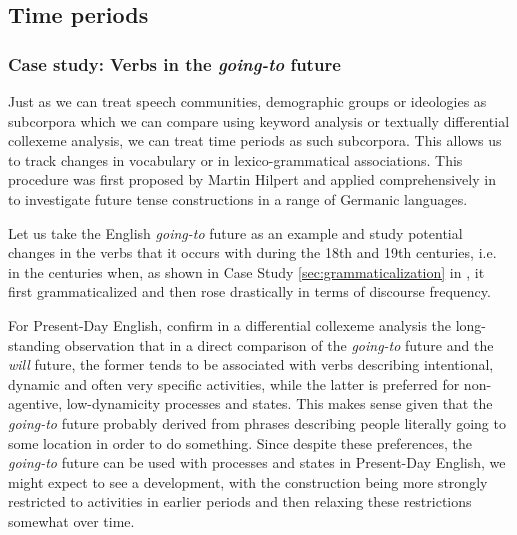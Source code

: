 \subsection{Time periods}

\subsubsection{Case study: Verbs in the \textit{going\hyp{}to} future}

Just as we can treat speech communities, demographic  groups or ideologies  as subcorpora which we can compare using keyword  analysis or textually differential collexeme  analysis, we can treat time periods as such subcorpora. This allows us to track changes in vocabulary or in lexico\hyp{}grammatical  associations.  This procedure was first proposed by Martin Hilpert and applied comprehensively in \citet{hilpert_germanic_2008} to investigate future tense constructions in a range of Germanic languages.

Let us take the English \textit{going\hyp{}to}  future as an example and study potential changes in the verbs  that it occurs with during the 18th and 19th centuries, i.e. in the centuries when, as shown in Case Study \ref{sec:grammaticalization} in , it first grammaticalized  and then rose drastically in terms of discourse  frequency.

For Present\hyp{}Day English, \citet{gries_extending_2004} confirm in a differential collexeme  analysis the long\hyp{}standing observation that in a direct comparison of the \textit{going\hyp{}to}  future and the \textit{will} future, the former tends to be associated  with verbs  describing intentional, dynamic  and often very specific activities,  while the latter is preferred for non\hyp{}agentive,  low\hyp{}dynamicity  processes and states. This makes sense given that the \textit{going\hyp{}to}  future probably derived from phrases describing people literally  going to some location in order to do something. Since despite these preferences, the \textit{going\hyp{}to} future can be used with processes  and states  in Present\hyp{}Day English, we might expect to see a development, with the construction being more strongly restricted to activities  in earlier periods and then relaxing these restrictions somewhat over time.

